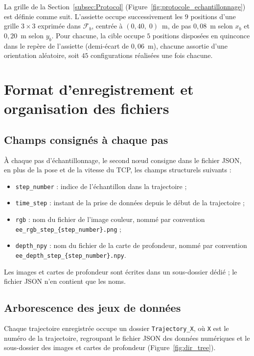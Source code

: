La grille de la Section~\ref{subsec:Protocol} (Figure~\ref{fig:protocole_echantillonnage}) est définie comme suit. L'assiette occupe successivement les $9$ positions d'une grille $3\times3$ exprimée dans $\mathcal{F}_b$, centrée à $(0{,}40,\;0)$~m, de pas $0{,}08$~m selon $x_b$ et $0{,}20$~m selon $y_b$. Pour chacune, la cible occupe $5$ positions disposées en quinconce dans le repère de l'assiette (demi-écart de $0{,}06$~m), chacune assortie d'une orientation aléatoire, soit $45$ configurations réalisées une fois chacune.

\section*{Format d'enregistrement et organisation des fichiers}

\subsection*{Champs consignés à chaque pas} À chaque pas d'échantillonnage, le second n\oe ud consigne dans le fichier \ac{JSON}, en plus de la pose et de la vitesse du \ac{TCP}, les champs structurels suivants :
\begin{itemize}
  \item \texttt{step\_number} : indice de l'échantillon dans la trajectoire ;
  \item \texttt{time\_step} : instant de la prise de données depuis le début de la trajectoire ;
  \item \texttt{rgb} : nom du fichier de l'image couleur, nommé par convention \\ \texttt{ee\_rgb\_step\_\{step\_number\}.png} ;
  \item \texttt{depth\_npy} : nom du fichier de la carte de profondeur, nommé par convention \\ \texttt{ee\_depth\_step\_\{step\_number\}.npy}.
\end{itemize}
Les images et cartes de profondeur sont écrites dans un sous-dossier dédié ; le fichier \ac{JSON} n'en contient que les noms.

\subsection*{Arborescence des jeux de données} Chaque trajectoire enregistrée occupe un dossier \texttt{Trajectory\_X}, où \texttt{X} est le numéro de la trajectoire, regroupant le fichier \ac{JSON} des données numériques et le sous-dossier des images et cartes de profondeur (Figure~\ref{fig:dir_tree}).

